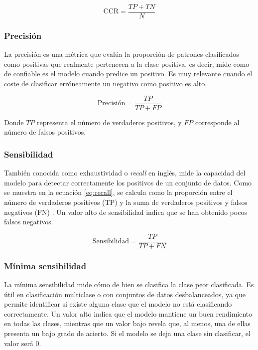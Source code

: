 \begin{equation}
	\label{eq:accuracy}
	\text{CCR} = \frac{TP+TN}{N}
\end{equation}

\subsubsection{Precisión}
\label{subsubsec:prec}

La precisión es una métrica que evalúa la proporción de patrones clasificados como positivas que realmente pertenecen a la clase positiva, es decir, mide como de confiable es el modelo cuando predice un positivo. Es muy relevante cuando el coste de clasificar erróneamente un negativo como positivo es alto.

\begin{equation}
	\text{Precisión} = \frac{TP}{TP + FP}
	\label{eq:precision}
\end{equation}

Donde \(TP\) representa el número de verdaderos positivos, y \(FP\) corresponde al número de falsos positivos.

\subsubsection{Sensibilidad}
\label{subsubsec:sens}

También conocida como exhaustividad o \textit{recall} en inglés, mide la capacidad del modelo para detectar correctamente los positivos de un conjunto de datos. Como se muestra en la ecuación \ref{eq:recall}, se calcula como la proporción entre el número de verdaderos positivos (TP) y la suma de verdaderos positivos y falsos negativos (FN) \cite{metrics}. Un valor alto de sensibilidad indica que se han obtenido pocos falsos negativos.

\begin{equation}
	\label{eq:recall}
	\text{Sensibilidad} = \frac{TP}{TP + FN}
\end{equation}

\subsubsection{Mínima sensibilidad}
\label{subsubsec:ms}

La mínima sensibilidad mide cómo de bien se clasifica la clase peor clasificada. Es útil en clasificación multiclase o con conjuntos de datos desbalanceados, ya que permite identificar si existe alguna clase que el modelo no está clasificando correctamente. Un valor alto indica que el modelo mantiene un buen rendimiento en todas las clases, mientras que un valor bajo revela que, al menos, una de ellas presenta un bajo grado de acierto. Si el modelo se deja una clase sin clasificar, el valor será 0.

